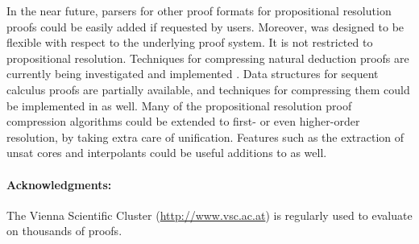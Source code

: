\documentclass{llncs}
\begin{document}
In the near future, parsers for other proof formats for propositional resolution proofs could be easily added if requested by users. Moreover, {\skeptik} was designed to be flexible with respect to the underlying proof system. It is not restricted to propositional resolution. Techniques for compressing natural deduction proofs are currently being investigated and implemented \cite{ContextualND}.
Data structures for sequent calculus proofs are partially available, and techniques for compressing them \cite{CutIntro} 
could be implemented in {\skeptik} as well. Many of the propositional resolution proof compression algorithms could be extended to first- or even higher-order resolution, by taking extra care of unification. Features such as the extraction of unsat cores and interpolants could be useful additions to {\skeptik} as well.

\vspace{-5pt}

\paragraph{Acknowledgments: } The Vienna Scientific Cluster (\url{http://www.vsc.ac.at}) is regularly used to evaluate {\skeptik} on thousands of proofs.




\end{document}
